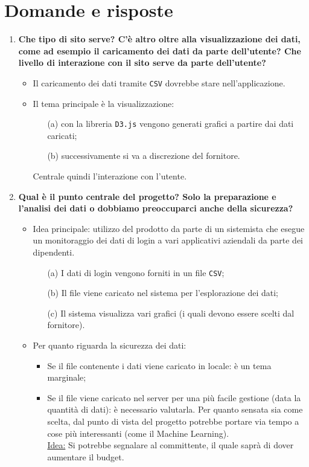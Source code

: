 \documentclass[11pt]{article}
\begin{document}
	\section{Domande e risposte}
		\begin{enumerate}
			\item \textbf{Che tipo di sito serve?
			C'è altro oltre alla visualizzazione dei dati, come ad esempio il caricamento dei dati da parte dell'utente?
			Che livello di interazione con il sito serve da parte dell'utente?}
			\medskip
			\begin{itemize}
				\item Il caricamento dei dati tramite \texttt{CSV} dovrebbe stare nell'applicazione.
				\item Il tema principale è la visualizzazione:
				\begin{itemize}
					\item [(a)] con la libreria \texttt{D3.js} vengono generati grafici a partire dai dati caricati;
					\item [(b)] successivamente si va a discrezione del fornitore.
				\end{itemize}
				Centrale quindi l'interazione con l'utente.
			\end{itemize}
		
			\bigskip
			
			\item \textbf{Qual è il punto centrale del progetto?
			Solo la preparazione e l'analisi dei dati o dobbiamo preoccuparci anche della sicurezza?}
			\medskip
			\begin{itemize}
				\item Idea principale: utilizzo del prodotto da parte di un sistemista che esegue un monitoraggio
				dei dati di login a vari applicativi aziendali da parte dei dipendenti.
				\begin{itemize}
					\item [(a)] I dati di login vengono forniti in un file \texttt{CSV};
					\item [(b)] Il file viene caricato nel sistema per l'esplorazione dei dati;
					\item [(c)] Il sistema visualizza vari grafici (i quali devono essere scelti dal fornitore).
				\end{itemize}
				\item Per quanto riguarda la sicurezza dei dati:
				\begin{itemize}
					\item Se il file contenente i dati viene caricato in locale: è un tema marginale;
					\item Se il file viene caricato nel server per una più facile gestione (data la quantità di dati):
					è necessario valutarla.
					Per quanto sensata sia come scelta, dal punto di vista del progetto potrebbe portare via tempo a
					cose più interessanti (come il Machine Learning).\\
					\underline{Idea:} Si potrebbe segnalare al  committente, il quale saprà di dover aumentare il budget.
				\end{itemize}
			\end{itemize}


\end{enumerate}
\end{document}
